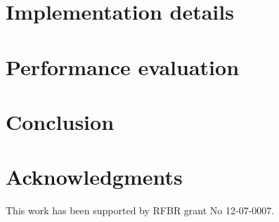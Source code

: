 \documentclass[1p]{elsarticle}
\begin{document}
\section{Implementation details}

\section{Performance evaluation}

\section{Conclusion}

\section{Acknowledgments}

This work has been supported by RFBR grant No 12-07-0007.

\nocite{*}


\end{document}
